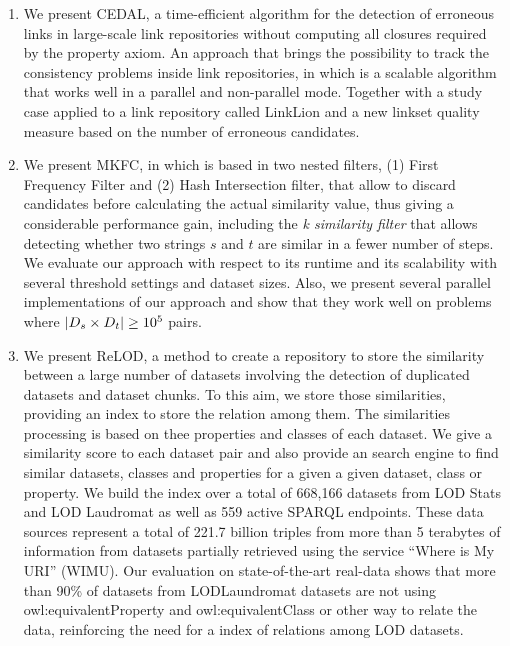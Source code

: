 \begin{enumerate}
    \item We present CEDAL\cite{valdestilhas2017cedal}, a time-efficient algorithm for the detection of erroneous links in large-scale link repositories without computing all closures required by the property axiom. An approach that brings the possibility to track the consistency problems inside link repositories, in which is a scalable algorithm that works well in a parallel and non-parallel mode. Together with a study case applied to a link repository called LinkLion and a new linkset quality measure based on the number of erroneous candidates.
	
	\item We present MKFC\cite{valdestilhas2017high}, in which is based in two nested filters, (1) First Frequency Filter and (2) Hash Intersection filter, that allow to discard candidates before calculating the actual similarity value, thus giving a considerable performance gain, including the \emph{k similarity filter} that allows detecting whether two strings $s$ and $t$ are similar in a fewer number of steps. We evaluate our approach with respect to its runtime and its scalability with several threshold settings and dataset sizes. Also, we present several parallel implementations of our approach and show that they work well on problems where $|{D_s}{} \times {\ensuremath{D_t}}{}| \geq 10^5$ pairs.
	
    \item We present ReLOD\cite{valdestilhas2019ReLOD}, a method to create a repository to store the similarity between a large number of datasets involving the detection of duplicated datasets and dataset chunks. To this aim, we store those similarities, providing an index to store the relation among them. The similarities processing is based on thee properties and classes of each dataset. We give a similarity score to each dataset pair and also provide an search engine to find similar datasets, classes and properties for a given a given dataset, class or property. We build the index over a total of 668,166 datasets from LOD Stats and LOD Laudromat as well as 559 active SPARQL endpoints. These data sources represent a total of 221.7 billion triples from more than 5 terabytes of information from datasets partially retrieved using the service ``Where is My URI'' (WIMU). Our evaluation on state-of-the-art real-data shows that more than 90\% of datasets from LODLaundromat datasets are not using owl:equivalentProperty and owl:equivalentClass or other way to relate the data, reinforcing the need for a index of relations among LOD datasets.%
    
\end{enumerate}

